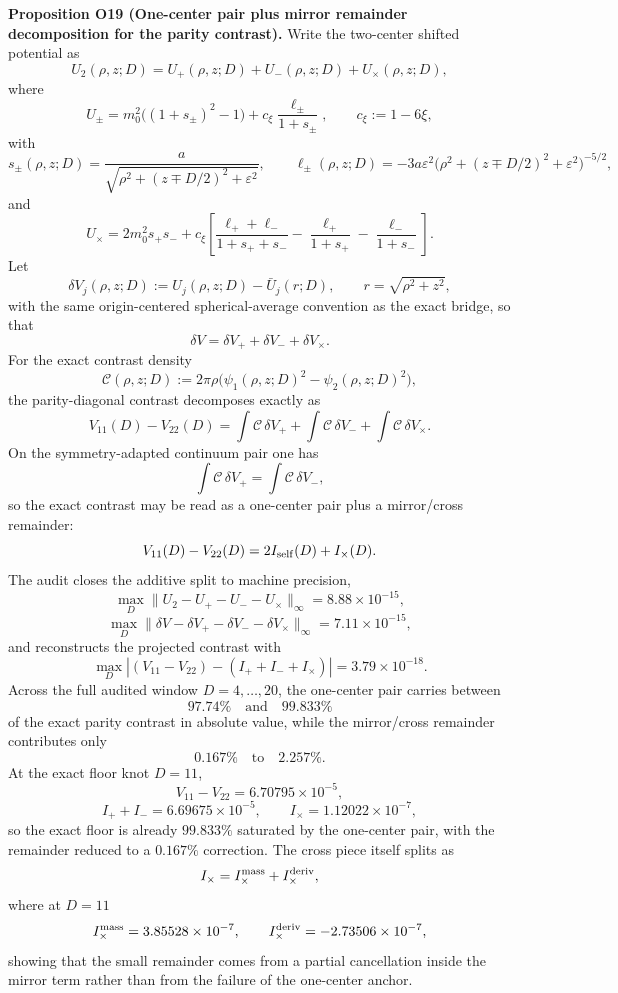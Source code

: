 \documentclass[aps,prd,onecolumn,notitlepage,nofootinbib,superscriptaddress,11pt,floatfix]{revtex4-2}
\begin{document}
\medskip\noindent\textbf{Proposition O19 (One-center pair plus mirror remainder decomposition for the parity contrast).}
Write the two-center shifted potential as
\[
U_2(\rho,z;D)=U_+(\rho,z;D)+U_-(\rho,z;D)+U_\times(\rho,z;D),
\]
where
\[
U_\pm
=
m_0^2\bigl((1+s_\pm)^2-1\bigr)+c_\xi\frac{\ell_\pm}{1+s_\pm},
\qquad
c_\xi:=1-6\xi,
\]
with
\[
s_\pm(\rho,z;D)=\frac{a}{\sqrt{\rho^2+(z\mp D/2)^2+\varepsilon^2}},
\qquad
\ell_\pm(\rho,z;D)=
-3a\varepsilon^2\bigl(\rho^2+(z\mp D/2)^2+\varepsilon^2\bigr)^{-5/2},
\]
and
\[
U_\times
=
2m_0^2 s_+ s_-
+
c_\xi\left[
\frac{\ell_++\ell_-}{1+s_++s_-}
-\frac{\ell_+}{1+s_+}
-\frac{\ell_-}{1+s_-}
\right].
\]
Let
\[
\delta V_j(\rho,z;D):=U_j(\rho,z;D)-\bar U_j(r;D),
\qquad
r=\sqrt{\rho^2+z^2},
\]
with the same origin-centered spherical-average convention as the exact bridge, so that
\[
\delta V=\delta V_+ + \delta V_- + \delta V_\times.
\]
For the exact contrast density
\[
\mathcal C(\rho,z;D):=
2\pi\rho\bigl(\psi_1(\rho,z;D)^2-\psi_2(\rho,z;D)^2\bigr),
\]
the parity-diagonal contrast decomposes exactly as
\[
V_{11}(D)-V_{22}(D)
=
\int \mathcal C\,\delta V_+
+
\int \mathcal C\,\delta V_-
+
\int \mathcal C\,\delta V_\times.
\]
On the symmetry-adapted continuum pair one has
\[
\int \mathcal C\,\delta V_+
=
\int \mathcal C\,\delta V_-,
\]
so the exact contrast may be read as a one-center pair plus a mirror/cross remainder:
\[
V_{11}(D)-V_{22}(D)=2I_{\rm self}(D)+I_\times(D).
\]
The audit  closes the additive split to machine precision,
\[
\max_D\|U_2-U_+-U_--U_\times\|_\infty
=8.88\times10^{-15},
\]
\[
\max_D\|\delta V-\delta V_+-\delta V_--\delta V_\times\|_\infty
=7.11\times10^{-15},
\]
and reconstructs the projected contrast with
\[
\max_D\left|(V_{11}-V_{22})-(I_++I_-+I_\times)\right|
=3.79\times10^{-18}.
\]
Across the full audited window \(D=4,\dots,20\), the one-center pair carries between
\[
97.74\%
\quad\text{and}\quad
99.833\%
\]
of the exact parity contrast in absolute value, while the mirror/cross remainder contributes only
\[
0.167\%
\quad\text{to}\quad
2.257\%.
\]
At the exact floor knot \(D=11\),
\[
V_{11}-V_{22}=6.70795\times10^{-5},
\]
\[
I_+ + I_- = 6.69675\times10^{-5},
\qquad
I_\times = 1.12022\times10^{-7},
\]
so the exact floor is already \(99.833\%\) saturated by the one-center pair, with the remainder reduced to a \(0.167\%\) correction.  The cross piece itself splits as
\[
I_\times=I_\times^{\rm mass}+I_\times^{\rm deriv},
\]
where at \(D=11\)
\[
I_\times^{\rm mass}=3.85528\times10^{-7},
\qquad
I_\times^{\rm deriv}=-2.73506\times10^{-7},
\]
showing that the small remainder comes from a partial cancellation inside the mirror term rather than from the failure of the one-center anchor.
\end{document}
